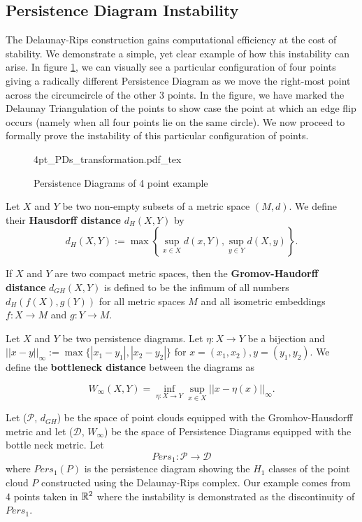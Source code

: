 \documentclass[letterpaper,titlepage]{article}
\newcommand{\incfig}[1]{%
    {#1.pdf_tex}
}
\begin{document}
\subsection{Persistence Diagram Instability} \label{instability_section}
The Delaunay-Rips construction gains computational efficiency at the cost of stability. We demonstrate a simple, yet clear example of how this instability can arise. In figure \ref{fig:4pt_PDs_transformation}, we can visually see a particular configuration of four points giving a radically different Persistence Diagram as we move the right-most point across the circumcircle of the other 3 points. In the figure, we have marked the Delaunay Triangulation of the points to show case the point at which an edge flip occurs (namely when all four points lie on the same circle). We now proceed to formally prove the instability of this particular configuration of points.

\begin{figure}[ht]
    \centering
    \def\svgwidth{\columnwidth}
    \incfig{4pt_PDs_transformation}
    \caption{Persistence Diagrams of 4 point example}
    \label{fig:4pt_PDs_transformation}
\end{figure}

\begin{defn}
    Let $X$ and $Y$ be two non-empty subsets of a metric space $(M,d)$. We define their \textbf{Hausdorff distance} $d_H(X,Y)$ by
    $$d_H(X,Y):=\max\left\{\sup_{x\in X} d(x,Y), \sup_{y\in Y} d(X,y)\right\}.$$
\end{defn}

\begin{defn}
    If $X$ and $Y$ are two compact metric spaces, then the \textbf{Gromov-Haudorff distance} $d_{GH}(X,Y)$ is defined to be the infimum of all numbers $d_H(f(X),g(Y))$ for all metric spaces $M$ and all isometric embeddings $f:X \to M$ and $g:Y \to M$.
\end{defn}

\begin{defn}
    Let $X$ and $Y$ be two persistence diagrams. Let $\eta:X\to Y$ be a bijection and $||x-y||_\infty := \max \{|x_1-y_1|,|x_2-y_2|\}$ for $x=(x_1,x_2), y=(y_1,y_2)$. We define the \textbf{bottleneck distance} between the diagrams as

    $$W_\infty(X,Y) = \inf_{\eta:X\to Y} \sup_{x\in X}||x-\eta(x)||_\infty.$$    
\end{defn}

Let ($\mathcal{P}$, $d_{GH}$) be the space of point clouds equipped with the Gromhov-Hausdorff metric and let ($\mathcal{D}$, $W_\infty$) be the space of Persistence Diagrams equipped with the bottle neck metric. Let
$$Pers_1: \mathcal{P} \to \mathcal{D}$$
where $Pers_1(P)$ is the persistence diagram showing the $H_1$ classes of the point cloud $P$ constructed using the Delaunay-Rips complex. Our example comes from 4 points taken in $\mathbb{R}^2$ where the instability is demonstrated as the discontinuity of $Pers_1$.
\end{document}
